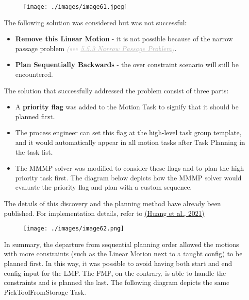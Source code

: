 \begin{figure}[H]
\texttt{[image: ./images/image61.jpeg]}
\end{figure}



The following solution was considered but was not successful:

\begin{itemize}
	\item \textbf{Remove this Linear Motion }- it is not possible because of the narrow passage problem \textit{\textcolor[HTML]{B7B7B7}{(see \uline{5.5.3 Narrow Passage Problem})}}. 

	\item \textbf{Plan Sequentially Backwards} - the over constraint scenario will still be encountered.

\end{itemize}
The solution that successfully addressed the problem consist of three parts:

\begin{itemize}
	\item A \textbf{priority flag }was added to the Motion Task to signify that it should be planned first. 

	\item The process engineer can set this flag at the high-level task group template, and it would automatically appear in all motion tasks after Task Planning in the task list.

	\item The MMMP solver was modified to consider these flags and to plan the high priority task first. The diagram below depicts how the MMMP solver would evaluate the priority flag and plan with a custom sequence.

\end{itemize}
The details of this discovery and the planning method have already been published. For implementation details, refer to \href{https://www.zotero.org/google-docs/?W31fOF}{(Huang et al., 2021)}

\begin{figure}[H]
\texttt{[image: ./images/image62.png]}
\end{figure}


In summary, the departure from sequential planning order allowed the motions with more constraints (such as the Linear Motion next to a taught config) to be planned first. In this way, it was possible to avoid having both start and end config input for the LMP. The FMP, on the contrary, is able to handle the constraints and is planned the last. The following diagram depicts the same PickToolFromStorage Task. 

